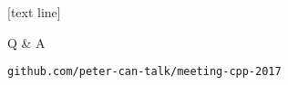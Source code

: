 
%

[text line]{}
\begin{slide}{}
  \vspace{1.4cm}
  {
    \fontsize{48}{48}\selectfont
    \color{orange}
    Q \& A
  }

  \vspace{1.2cm}
  {\large\texttt{github.com/peter-can-talk/meeting-cpp-2017}}
\end{slide}
